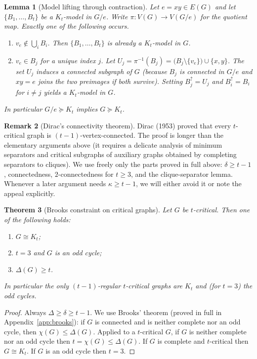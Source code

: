 \documentclass[11pt]{article}
\newtheorem{theorem}{Theorem}[section]
\newtheorem{lemma}[theorem]{Lemma}
\theoremstyle{definition}
\newtheorem{remark}[theorem]{Remark}
\begin{document}
\begin{lemma}[Model lifting through contraction]\label{lem:lift}
Let \(e=xy\in E(G)\) and let \(\{B_1,\dots,B_t\}\) be a \(K_t\)-model in \(G/e\).
Write \(\pi:V(G)\to V(G/e)\) for the quotient map. Exactly one of the following
occurs.
\begin{enumerate}
\item[\rm(A)] \(v_e\notin\bigcup_i B_i\). Then \(\{B_1,\dots,B_t\}\) is already a
\(K_t\)-model in \(G\).
\item[\rm(B)] \(v_e\in B_j\) for a unique index \(j\). Let
\(U_j=\pi^{-1}(B_j)=\bigl(B_j\setminus\{v_e\}\bigr)\cup\{x,y\}\). The set
\(U_j\) induces a connected subgraph of \(G\) (because \(B_j\) is connected in
\(G/e\) and \(xy=e\) joins the two preimages if both survive). Setting
\(B_j^\uparrow=U_j\) and \(B_i^\uparrow=B_i\) for \(i\neq j\) yields a
\(K_t\)-model in \(G\).
\end{enumerate}
In particular \(G/e\succcurlyeq K_t\) implies \(G\succcurlyeq K_t\).
\end{lemma}

\begin{remark}[Dirac's connectivity theorem]
Dirac (1953) proved that every \(t\)-critical graph is \((t-1)\)-vertex-connected.
The proof is longer than the elementary arguments above (it requires a delicate
analysis of minimum separators and critical subgraphs of auxiliary graphs
obtained by completing separators to cliques). We use freely only the parts
proved in full above: \(\delta\ge t-1\), connectedness, \(2\)-connectedness for
\(t\ge 3\), and the clique-separator lemma. Whenever a later argument needs
\(\kappa\ge t-1\), we will either avoid it or note the appeal explicitly.
\end{remark}

\begin{theorem}[Brooks constraint on critical graphs]\label{thm:brooks-crit}
Let \(G\) be \(t\)-critical. Then one of the following holds:
\begin{enumerate}
\item \(G\cong K_t\);
\item \(t=3\) and \(G\) is an odd cycle;
\item \(\Delta(G)\ge t\).
\end{enumerate}
In particular the only \((t-1)\)-regular \(t\)-critical graphs are \(K_t\) and
(for \(t=3\)) the odd cycles.
\end{theorem}

\begin{proof}
Always \(\Delta\ge\delta\ge t-1\). We use Brooks' theorem (proved in full in
Appendix~\ref{app:brooks}): if \(G\) is connected and is neither complete nor an
odd cycle, then \(\chi(G)\le\Delta(G)\). Applied to a \(t\)-critical \(G\), if
\(G\) is neither complete nor an odd cycle then \(t=\chi(G)\le\Delta(G)\). If
\(G\) is complete and \(t\)-critical then \(G\cong K_t\). If \(G\) is an odd
cycle then \(t=3\).
\end{proof}
\end{document}
